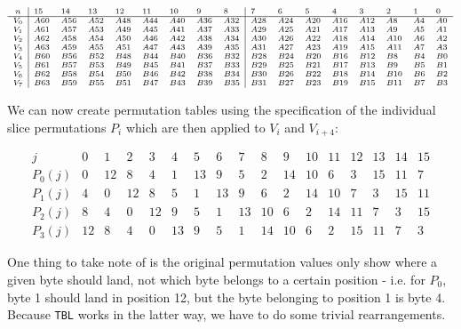 \[
    \scriptsize
    \begin{array}{c|llllllll|llllllll}
        n & 15 & 14 & 13 & 12 & 11 & 10 & 9 & 8 & 7 & 6 & 5 & 4 & 3 & 2 & 1 & 0 \\
        \hline
        V_0 & A60 & A56 & A52 & A48 & A44 & A40 & A36 & A32 & A28 & A24 & A20 & A16 & A12 & A8  & A4 & A0 \\
        V_1 & A61 & A57 & A53 & A49 & A45 & A41 & A37 & A33 & A29 & A25 & A21 & A17 & A13 & A9  & A5 & A1 \\
        V_2 & A62 & A58 & A54 & A50 & A46 & A42 & A38 & A34 & A30 & A26 & A22 & A18 & A14 & A10 & A6 & A2 \\
        V_3 & A63 & A59 & A55 & A51 & A47 & A43 & A39 & A35 & A31 & A27 & A23 & A19 & A15 & A11 & A7 & A3 \\
        V_4 & B60 & B56 & B52 & B48 & B44 & B40 & B36 & B32 & B28 & B24 & B20 & B16 & B12 & B8  & B4 & B0 \\
        V_5 & B61 & B57 & B53 & B49 & B45 & B41 & B37 & B33 & B29 & B25 & B21 & B17 & B13 & B9  & B5 & B1 \\
        V_6 & B62 & B58 & B54 & B50 & B46 & B42 & B38 & B34 & B30 & B26 & B22 & B18 & B14 & B10 & B6 & B2 \\
        V_7 & B63 & B59 & B55 & B51 & B47 & B43 & B39 & B35 & B31 & B27 & B23 & B19 & B15 & B11 & B7 & B3
    \end{array}
\]

We can now create permutation tables using the specification of the individual
slice permutations $P_i$ which are then applied to $V_i$ and $V_{i+4}$:

\[
    \begin{array}{c|llllllllllllllll}
        j & 0 & 1 & 2 & 3 & 4 & 5 & 6 & 7 & 8 & 9 & 10 & 11 & 12 & 13 & 14 & 15 \\
        \hline
        P_0(j) & 0 & 12 & 8 & 4 & 1 & 13 & 9 & 5 & 2 & 14 & 10 & 6 & 3 & 15 & 11 & 7 \\
        P_1(j) & 4 & 0 & 12 & 8 & 5 & 1 & 13 & 9 & 6 & 2 & 14 & 10 & 7 & 3 & 15 & 11 \\
        P_2(j) & 8 & 4 & 0 & 12 & 9 & 5 & 1 & 13 & 10 & 6 & 2 & 14 & 11 & 7 & 3 & 15 \\
        P_3(j) & 12 & 8 & 4 & 0 & 13 & 9 & 5 & 1 & 14 & 10 & 6 & 2 & 15 & 11 & 7 & 3
    \end{array}
\]

One thing to take note of is the original permutation values only show where a
given byte should land, not which byte belongs to a certain position - i.e. for
$P_0$, byte 1 should land in position 12, but the byte belonging to position 1
is byte 4. Because \texttt{TBL} works in the latter way, we have to do some
trivial rearrangements.

